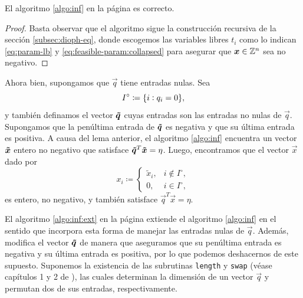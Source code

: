\begin{lemma}
	\label{lemma:alg:inf:correct}
	El algoritmo \ref{algo:inf} en la página \pageref{algo:inf} es correcto.
\end{lemma}
\begin{proof}
	Basta observar que el algoritmo sigue la construcción recursiva de la sección
	\ref{subsec:dioph-eq}, donde escogemos las variables libres $t_i$ como lo indican
	\eqref{eq:param-lb} y \eqref{eq:feasible-param:collapsed} para asegurar que $\boldsymbol{x} \in \mathbb{Z}^n$
	sea no negativo.
\end{proof}

Ahora bien, supongamos que $\vec{q}$ tiene entradas nulas. Sea
\begin{equation*}
	I^\circ \coloneq \lbrace i \vcentcolon q_i = 0 \rbrace,
\end{equation*}
y también definamos el vector $\boldsymbol{\tilde{q}}$ cuyas entradas son las entradas no nulas de $\vec{q}$.
Supongamos que la penúltima entrada de $\boldsymbol{\tilde{q}}$ es negativa y que su última entrada es positiva. A
causa del lema anterior, el algoritmo \ref{algo:inf} encuentra un vector $\boldsymbol{\tilde{x}}$ entero no
negativo que satisface $\boldsymbol{\tilde{q}}^T\boldsymbol{\tilde{x}} = \eta$. Luego, encontramos que el vector $\vec{x}$ dado
por
\begin{equation*}
	x_i \coloneq
	\begin{cases}
		\tilde{x}_i, & i \not \in I^\circ, \\
		0, & i \in I^\circ,
	\end{cases}
\end{equation*}
es entero, no negativo, y también satisface $\vec{q}^T\vec{x} = \eta$.

El algoritmo \ref{algo:inf:ext} en la página \pageref{algo:inf:ext} extiende el algoritmo
\ref{algo:inf} en el sentido que incorpora esta forma de manejar las entradas nulas de $\vec{q}$.
Además, modifica el vector $\boldsymbol{\tilde{q}}$ de manera que aseguramos que su penúltima entrada es negativa
y su última entrada es positiva, por lo que podemos deshacernos de este supuesto. Suponemos la
existencia de las subrutinas \texttt{length} y \texttt{swap} (véase capítulos 1 y 2 de
\cite{knuth1}), las cuales determinan la dimensión de un vector $\vec{q}$ y permutan dos de sus
entradas, respectivamente.

